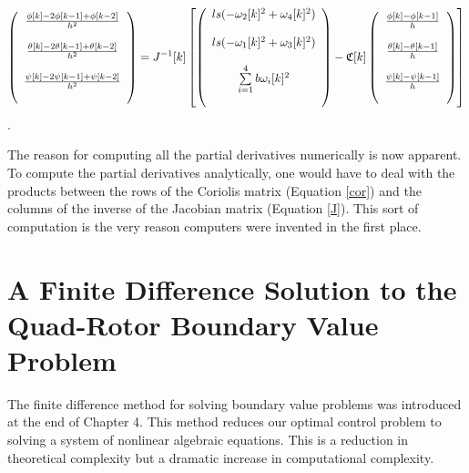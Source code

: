 \begin{equation}
    \left(
        \begin{array}{c}
           \frac{\phi[k] -2 \phi[k-1] + \phi[k-2]}{h^2}\\\\
           \frac{\theta[k] -2 \theta[k-1] + \theta[k-2]}{h^2}\\\\
           \frac{\psi[k] -2 \psi[k-1] + \psi[k-2]}{h^2}\\\\
        \end{array}
    \right) = J^{-1}[k]
    \left[ \left(
        \begin{array}{c}
            l s (-\omega_2[k]^2 + \omega_4[k]^2)\\\\
            l s (-\omega_1[k]^2 + \omega_3[k]^2)\\\\
            \sum \limits_{i=1}^4 b \omega_i[k]^2\\\\
        \end{array}
    \right) -
    \mathfrak{C}[k]
    \left(
        \begin{array}{c}
           \frac{\phi[k] - \phi[k-1]}{h} \\\\
           \frac{\theta[k] - \theta[k-1]}{h} \\\\
           \frac{\psi[k] - \psi[k-1]}{h} \\\\
        \end{array}
    \right)
    \right]
\end{equation} .

The reason for computing all the partial derivatives numerically is now apparent. To compute the partial derivatives analytically, one would have to deal with the products between the rows of the Coriolis matrix (Equation \ref{cor}) and the columns of the inverse of the Jacobian matrix (Equation \ref{J}). This sort of computation is the very reason computers were invented in the first place.


\section{A Finite Difference Solution to the Quad-Rotor Boundary Value Problem}

The finite difference method for solving boundary value problems was introduced at the end of Chapter 4. This method reduces our optimal control problem to solving a system of nonlinear algebraic equations. This is a reduction in theoretical complexity but a dramatic increase in computational complexity.

